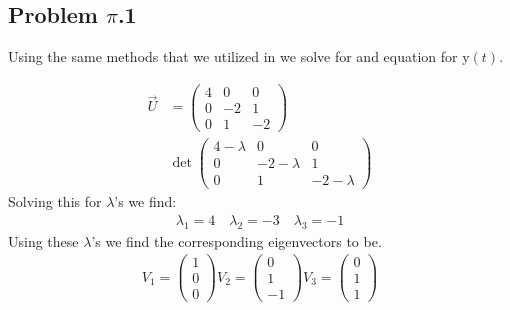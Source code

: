 \documentclass[10pt]{article}
\begin{document}
\begin{multicols}{2}
  \subsection{Problem $\pi$.1}\label{sub:problem_pi_1}

  Using the same methods that we utilized in  we solve
  for and equation for $\textrm{y}(t)$.

  \begin{align*}
    \vec{U} &= \begin{pmatrix}
      4 & 0 & 0\\
      0 & -2 & 1\\
      0 & 1 & -2
    \end{pmatrix} \\
    &\det\begin{pmatrix}
    4-\lambda & 0 & 0\\
    0 & -2-\lambda & 1\\
    0 & 1 & -2-\lambda
  \end{pmatrix}
\end{align*}
Solving this for $\lambda$'s we find:
\begin{align*}
  \lambda_1 = 4 \quad \lambda_2 = -3 \quad \lambda_3 = -1
\end{align*}
Using these $\lambda$'s we find the corresponding eigenvectors to be.
\begin{align*}
  V_1 = \begin{pmatrix}1\\0\\0\end{pmatrix}
  V_2 = \begin{pmatrix}0\\1\\-1\end{pmatrix}
  V_3 = \begin{pmatrix}0\\1\\1\end{pmatrix}
\end{align*}


\end{multicols}
\end{document}
